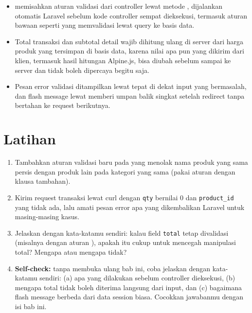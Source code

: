 \begin{itemize}
  \item {} memisahkan aturan validasi dari
    controller lewat metode , dijalankan otomatis
    Laravel sebelum kode controller sempat dieksekusi, termasuk aturan
    bawaan seperti  yang memvalidasi lewat query ke
    basis data.
  \item Total transaksi dan subtotal detail wajib dihitung ulang di
    server dari harga produk yang tersimpan di basis data, karena nilai
    apa pun yang dikirim dari klien, termasuk hasil hitungan Alpine.js,
    bisa diubah sebelum sampai ke server dan tidak boleh dipercaya
    begitu saja.
  \item Pesan error validasi ditampilkan lewat  tepat
    di dekat input yang bermasalah, dan flash message lewat
     memberi umpan balik singkat setelah
    redirect tanpa bertahan ke request berikutnya.
\end{itemize}

\section{Latihan}

\begin{enumerate}
  \item Tambahkan aturan validasi baru pada 
    yang menolak nama produk yang sama persis dengan produk lain pada
    kategori yang sama (pakai aturan  dengan klausa
    tambahan).
  \item Kirim request transaksi lewat curl dengan \texttt{qty} bernilai
    0 dan \texttt{product\_id} yang tidak ada, lalu amati pesan error
    apa yang dikembalikan Laravel untuk masing-masing kasus.
  \item Jelaskan dengan kata-katamu sendiri: kalau field \texttt{total}
    tetap divalidasi (misalnya dengan aturan ), apakah
    itu cukup untuk mencegah manipulasi total? Mengapa atau mengapa
    tidak?
  \item \textbf{Self-check:} tanpa membuka ulang bab ini, coba jelaskan
    dengan kata-katamu sendiri: (a) apa yang dilakukan
     sebelum controller dieksekusi, (b) mengapa
    total tidak boleh diterima langsung dari input, dan (c) bagaimana
    flash message berbeda dari data session biasa. Cocokkan jawabanmu
    dengan isi bab ini.
\end{enumerate}

